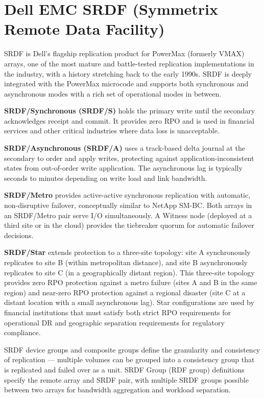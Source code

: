 \section{Dell EMC SRDF (Symmetrix Remote Data Facility)}
SRDF is Dell's flagship replication product for PowerMax (formerly VMAX) arrays, one of the most mature and battle-tested replication implementations in the industry, with a history stretching back to the early 1990s. SRDF is deeply integrated with the PowerMax microcode and supports both synchronous and asynchronous modes with a rich set of operational modes in between.

\textbf{SRDF/Synchronous (SRDF/S)} holds the primary write until the secondary acknowledges receipt and commit. It provides zero RPO and is used in financial services and other critical industries where data loss is unacceptable.

\textbf{SRDF/Asynchronous (SRDF/A)} uses a track-based delta journal at the secondary to order and apply writes, protecting against application-inconsistent states from out-of-order write application. The asynchronous lag is typically seconds to minutes depending on write load and link bandwidth.

\textbf{SRDF/Metro} provides active-active synchronous replication with automatic, non-disruptive failover, conceptually similar to NetApp SM-BC. Both arrays in an SRDF/Metro pair serve I/O simultaneously. A Witness node (deployed at a third site or in the cloud) provides the tiebreaker quorum for automatic failover decisions.

\textbf{SRDF/Star} extends protection to a three-site topology: site A synchronously replicates to site B (within metropolitan distance), and site B asynchronously replicates to site C (in a geographically distant region). This three-site topology provides zero RPO protection against a metro failure (sites A and B in the same region) and near-zero RPO protection against a regional disaster (site C at a distant location with a small asynchronous lag). Star configurations are used by financial institutions that must satisfy both strict RPO requirements for operational DR and geographic separation requirements for regulatory compliance.

SRDF device groups and composite groups define the granularity and consistency of replication --- multiple volumes can be grouped into a consistency group that is replicated and failed over as a unit. SRDF Group (RDF group) definitions specify the remote array and SRDF pair, with multiple SRDF groups possible between two arrays for bandwidth aggregation and workload separation.

